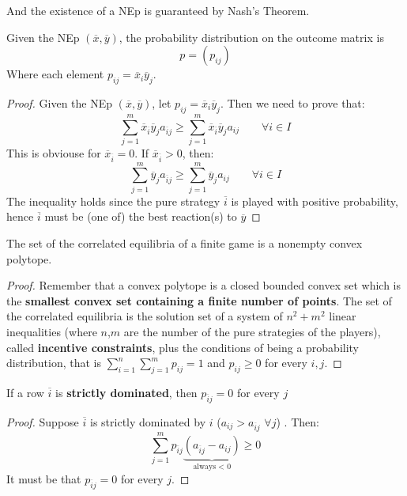 \documentclass[../main.tex]{subfiles}
\begin{document}
And the existence of a \gls{NEp} is guaranteed by Nash's Theorem.

Given the \gls{NEp} $(\overline{x}, \overline{y})$, the probability distribution on the outcome matrix is
\[
    p = (p_{ij})
\]
Where each element $p_{ij} = \overline{x}_i \overline{y}_j$.
\begin{proof}
    Given the \gls{NEp} $(\overline{x}, \overline{y})$, let $p_{ij} = \overline{x}_i \overline{y}_j$. Then we need to prove that:
    \begin{equation*}
        \sum_{j=1}^{m} \overline{x}_{\overline{i}} \overline{y}_j a_{\overline{i}j} \geq \sum_{j=1}^{m} \overline{x}_{\overline{i}} \overline{y}_j a_{ij} \qquad \forall i \in I
    \end{equation*}
    This is obviouse for $\overline{x}_{\overline{i}} = 0$. If $\overline{x}_{\overline{i}} > 0$, then:
    \begin{equation*}
        \sum_{j=1}^{m} \overline{y}_j a_{\overline{i}j} \geq \sum_{j=1}^{m} \overline{y}_j a_{ij} \qquad \forall i \in I
    \end{equation*}
    The inequality holds since the pure strategy $\overline{i}$ is played with positive probability, hence  $\overline{i}$ must be (one of) the best reaction(s) to $\overline{y}$
\end{proof}
\begin{theorem}
    The set of the correlated equilibria of a finite game is a nonempty convex polytope.
\end{theorem}
\begin{proof}
    Remember that a convex polytope is a closed bounded convex set which is the \textbf{smallest convex set containing a finite number of points}. The set of the correlated equilibria is the solution set of a system of $n^2 + m^2$ linear inequalities (where $n$,$m$ are the number of the pure strategies of the players), called \textbf{incentive constraints}, plus the conditions of being a probability distribution, that is $\sum_{i=1}^{n} \sum_{j=1}^{m} p_{ij} = 1$ and $p_{ij} \geq 0$ for every $i,j$.
\end{proof}
\begin{proposition}
    If a row $\overline{i}$ is \textbf{strictly dominated}, then $p_{\overline{i}j} = 0$ for every $j$
\end{proposition}
\begin{proof}
    Suppose $\overline{i}$ is strictly dominated by $i$ ($a_{ij} > a_{\overline{i}j}$ $\forall j$) . Then:
    \begin{equation*}
        \sum_{j=1}^{m} p_{\overline{i}j} \underbrace{(a_{\overline{i}j}  - a_{ij})}_{\text{always < 0}} \geq 0
    \end{equation*}
    It must be that $p_{\overline{i}j} = 0$ for every $j$.
\end{proof}
\end{document}
